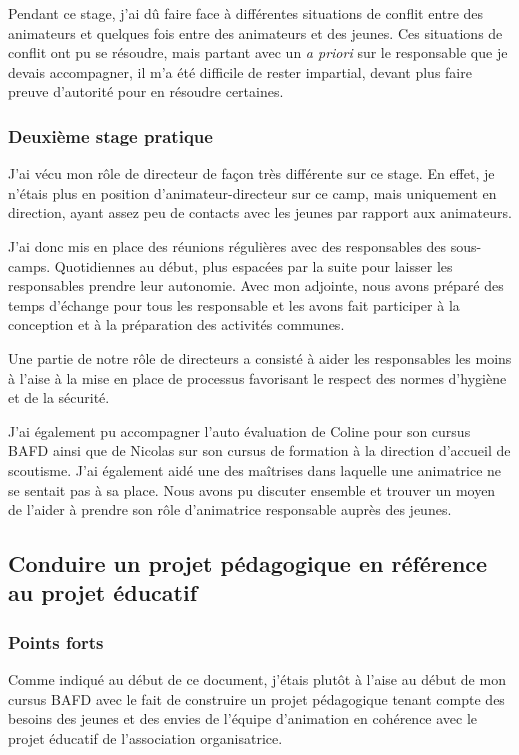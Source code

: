 \documentclass[titlepage,11pt,a4paper]{article}
\begin{document}
Pendant ce stage, j'ai dû faire face à différentes situations de conflit entre des
animateurs et quelques fois entre des animateurs et des jeunes. Ces situations de conflit
ont pu se résoudre, mais partant avec un \textit{a priori} sur le responsable que je
devais accompagner, il m'a été difficile de rester impartial, devant plus faire preuve
d'autorité pour en résoudre certaines.

\subsubsection{Deuxième stage pratique}

J'ai vécu mon rôle de directeur de façon très différente sur ce stage. En effet,
je n'étais plus en position d'animateur-directeur sur ce camp, mais uniquement en
direction, ayant assez peu de contacts avec les jeunes par rapport aux animateurs.

J'ai donc mis en place des réunions régulières avec des responsables des sous-camps.
Quotidiennes au début, plus espacées par la suite pour laisser les responsables prendre leur autonomie.
Avec mon adjointe, nous avons préparé des temps d'échange pour tous les responsable et les
avons fait participer à la conception et à la préparation des activités communes.

Une partie de notre rôle de directeurs a consisté à aider les responsables les moins à l'aise à
la mise en place de processus favorisant le respect des normes d'hygiène et de la sécurité.

J'ai également pu accompagner l'auto évaluation de Coline pour son cursus BAFD ainsi que
de Nicolas sur son cursus de formation à la direction d'accueil de scoutisme. J'ai
également aidé une des maîtrises dans laquelle une animatrice ne se
sentait pas à sa place. Nous avons pu discuter ensemble et trouver un moyen de l'aider à
prendre son rôle d'animatrice responsable auprès des jeunes.

\subsection{Conduire un projet pédagogique en référence au projet éducatif}

\subsubsection{Points forts}

Comme indiqué au début de ce document, j'étais plutôt à l'aise au début de mon cursus BAFD
avec le fait de construire un projet pédagogique tenant compte des besoins des jeunes et des
envies de l'équipe d'animation en cohérence avec le projet éducatif de l'association
organisatrice.
\end{document}
